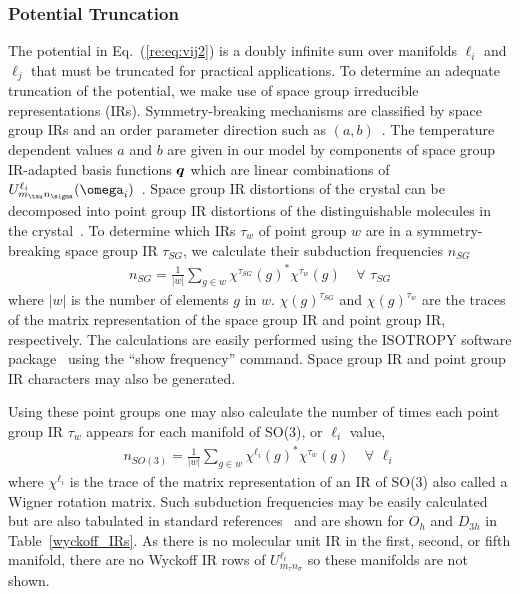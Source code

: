 \documentclass[preprint]{iucr}              %
\newcommand{\mb}[1]{\ensuremath{\mbox{\boldmath $ #1 $}}}
\begin{document}
\subsubsection{Potential Truncation}
\label{truncation}

The potential in Eq.~(\ref{re:eq:vij2}) is a doubly infinite sum over
manifolds $\ell_i$ and $\ell_j$ that must be truncated for practical
applications. To determine an adequate truncation of the potential, we
make use of space group irreducible representations (IRs).
Symmetry-breaking mechanisms are classified by space group IRs and
an order parameter direction such as $(a,b)$~\cite{Stokes07}.  The
temperature dependent values $a$ and $b$ are given in our model by
components of space group IR-adapted basis functions $\mb{q}$ which
are linear combinations of $U^{\ell_i}_{m_\tau
n_\sigma}(\mb{\omega}_i)$~\cite{Mettes04}. Space group IR
distortions of the crystal can be decomposed into point group IR
distortions of the distinguishable molecules in the
crystal~\cite{Stokes91}. To determine which IRs $\tau_w$ of point
group $w$ are in a symmetry-breaking space group IR $\tau_{SG}$, we
calculate their subduction frequencies $n_{SG}$
\begin{eqnarray}
\label{subduction1} n_{SG}=\frac{1}{|w|}\sum_{g\in
w}\chi^{\tau_{SG}}(g)^*\chi^{\tau_w}(g)\;\;\;\;\forall\,\,\tau_{SG}
\end{eqnarray}
where $|w|$ is the number of elements $g$ in $w$.
$\chi(g)^{\tau_{SG}}$ and $\chi(g)^{\tau_w}$ are the traces of the
matrix representation of the space group IR and point group IR,
respectively. The calculations are easily performed using the
{I\small SOTROPY} software package~\cite{Stokes07} using the ``show
frequency'' command. Space group IR and point group IR characters
may also be generated.

Using these point groups one may also calculate the number of times
each point group IR $\tau_w$ appears for each manifold of SO(3), or
$\ell_i$ value,
\begin{eqnarray}
\label{subduction2} n_{SO(3)}=\frac{1}{|w|}\sum_{g\in
w}\chi^{\ell_i}(g)^*\chi^{\tau_w}(g)\;\;\;\;\forall\,\,\ell_i
\end{eqnarray}
where $\chi^{\ell_i}$ is the trace of the matrix representation of
an IR of SO(3) also called a Wigner rotation matrix. Such subduction
frequencies may be easily calculated but are also tabulated in
standard references~\cite{Bradley72} and are shown for
$O_h$ and $D_{3h}$ in Table~\ref{wyckoff_IRs}.  As there is no
molecular unit IR in the first, second, or fifth manifold, there are
no Wyckoff IR rows of $U^{\ell_i}_{m_\tau n_\sigma}$ so these
manifolds are not shown.
\end{document}
